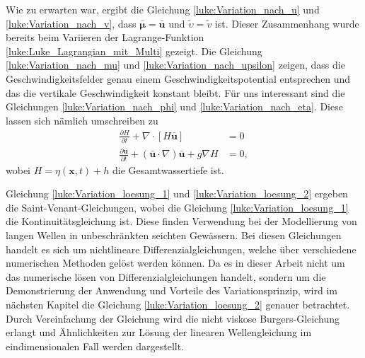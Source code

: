 Wie zu erwarten war, ergibt die Gleichung \eqref{luke:Variation_nach_u}
und \eqref{luke:Variation_nach_v}, dass $\bar{\bm{\mu}} = \bar{\bm{u}}$
und $\tilde{\upsilon} = \tilde{v}$ ist.
Dieser Zusammenhang wurde bereits beim Variieren der Lagrange-Funktion \eqref{luke:Luke_Lagrangian_mit_Multi} gezeigt.
Die Gleichung \eqref{luke:Variation_nach_mu} und \eqref{luke:Variation_nach_upsilon} zeigen, dass die Geschwindigkeitsfelder genau einem Geschwindigkeitspotential entsprechen und das die vertikale Geschwindigkeit konstant bleibt. 
Für uns interessant sind die Gleichungen \eqref{luke:Variation_nach_phi} und \eqref{luke:Variation_nach_eta}.
Diese lassen sich nämlich umschreiben zu 
\begin{align}
	\frac{\partial H}{\partial t} + \nabla \cdot [H \bar{\bm{u}}] &= 0
	\label{luke:Variation_loesung_1}
\\
	\frac{\partial \bar{\bm{u}}}{\partial t} + (\bar{\bm{u}} \cdot \nabla) \bar{\bm{u}} + g \nabla H &= 0,
	\label{luke:Variation_loesung_2}
\end{align}
wobei $H = \eta(\bm{x},t) + h$ die Gesamtwassertiefe ist.

Gleichung \eqref{luke:Variation_loesung_1} und
\eqref{luke:Variation_loesung_2} ergeben die Saint-Venant-Gleichungen,
wobei die Gleichung \eqref{luke:Variation_loesung_1} die
Kontinuitätsgleichung ist.
%
Diese finden Verwendung bei der Modellierung von langen Wellen in unbeschränkten seichten Gewässern.
%
Bei diesen Gleichungen handelt es sich um nichtlineare Differenzialgleichungen, welche über verschiedene numerischen Methoden gelöst werden können.
Da es in dieser Arbeit nicht um das numerische lösen von Differenzialgleichungen handelt, sondern um die Demonstrierung der Anwendung und Vorteile des Variationsprinzip, wird im nächsten Kapitel die Gleichung \eqref{luke:Variation_loesung_2} genauer betrachtet.
Durch Vereinfachung der Gleichung wird die nicht viskose Burgers-Gleichung
erlangt und Ähnlichkeiten zur Lösung der linearen Wellengleichung
im eindimensionalen Fall werden dargestellt.
%

